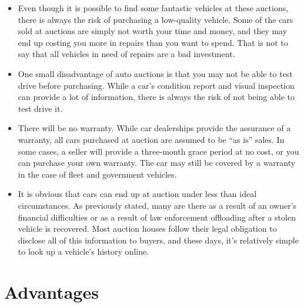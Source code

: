 \documentclass{report}
\begin{document}
\begin{itemize}
\item  Even though it is possible to find some fantastic vehicles at these  auctions, there is always the risk of purchasing a low-quality vehicle. Some of the cars sold at auctions are simply not worth your time and money, and they may end up costing you more in repairs than you want to spend. That is not to say that all vehicles in need of repairs are a bad investment. 
\item  One small disadvantage of auto auctions is that you may not be able to test drive before purchasing. While a car's condition report and visual inspection can provide a lot of information, there is always the risk of not being able to test drive it.
\item  There will be no warranty. While car dealerships provide the assurance of a warranty, all cars purchased at auction are assumed to be “as is” sales. In some cases, a seller will provide a three-month grace period at no cost, or you can purchase your own warranty. The car may still be covered by a warranty in the case of fleet and government vehicles.
\item  It is obvious that cars can end up at auction under less than ideal circumstances. As previously stated, many are there as a result of an owner's financial difficulties or as a result of law enforcement offloading after a stolen vehicle is recovered. Most auction houses follow their legal obligation to disclose all of this information to buyers, and these days, it's relatively simple to look up a vehicle's history online.

\end{itemize}

\section*{Advantages}
\end{document}
